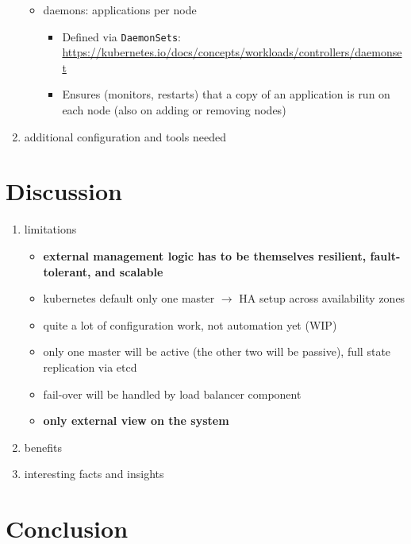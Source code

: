 \begin{enumerate}
\begin{itemize}
            \item daemons: applications per node
              \begin{itemize}
                \item Defined via \texttt{DaemonSets}: \url{https://kubernetes.io/docs/concepts/workloads/controllers/daemonset}
                \item Ensures (monitors, restarts) that a copy of an application is run on each node (also on adding or removing nodes)
              \end{itemize}
          \end{itemize}
    \item additional configuration and tools needed
  \end{enumerate}

\section{Discussion}
  \begin{enumerate}
    \item limitations
      \begin{itemize}
        \item \textbf{external management logic has to be themselves resilient, fault-tolerant, and scalable}
        \item \gls{kubernetes} default only one master $\rightarrow$ HA setup across availability zones
        \item quite a lot of configuration work, not automation yet (WIP)
        \item only one master will be active (the other two will be passive), full state replication via etcd
        \item fail-over will be handled by load balancer component
        \item \textbf{only external view on the system}
      \end{itemize}
    \item benefits
    \item interesting facts and insights
  \end{enumerate}
 
 \section{Conclusion}

